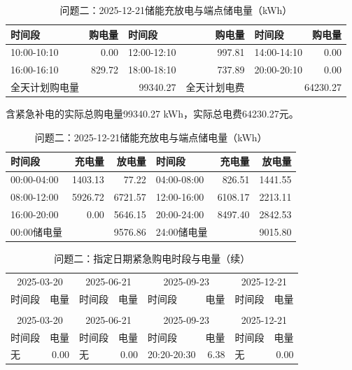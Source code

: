 \begin{table}[H]\centering\small\setlength{\tabcolsep}{5pt}
\caption{问题二：2025-12-21购电结果（电量：kWh；费用：元）}
\begin{tabular}{lrlrlr}\toprule
时间段 & 购电量 & 时间段 & 购电量 & 时间段 & 购电量 \\\midrule
10:00-10:10 & 0.00 & 12:00-12:10 & 997.81 & 14:00-14:10 & 0.00\\
16:00-16:10 & 829.72 & 18:00-18:10 & 737.89 & 20:00-20:10 & 0.00\\
\midrule 全天计划购电量 & \multicolumn{2}{r}{99340.27} & 全天计划电费 & \multicolumn{2}{r}{64230.27}\\\bottomrule
\end{tabular}
\par\vspace{2pt}\footnotesize
含紧急补电的实际总购电量99340.27 kWh，实际总电费64230.27元。
\vspace{3pt}\small
\caption{问题二：2025-12-21储能充放电与端点储电量（kWh）}
\begin{tabular}{lrrlrr}\toprule
时间段 & 充电量 & 放电量 & 时间段 & 充电量 & 放电量 \\\midrule
00:00-04:00 & 1403.13 & 77.22 & 04:00-08:00 & 826.51 & 1441.55\\
08:00-12:00 & 5926.72 & 6721.57 & 12:00-16:00 & 6108.17 & 2213.11\\
16:00-20:00 & 0.00 & 5646.15 & 20:00-24:00 & 8497.40 & 2842.53\\
\midrule 00:00储电量 & \multicolumn{2}{r}{9576.86} & 24:00储电量 & \multicolumn{2}{r}{9015.80}\\\bottomrule
\end{tabular}\end{table}
{\footnotesize\setlength{\tabcolsep}{3pt}
\begin{longtable}{lr|lr|lr|lr}
\caption{问题二：指定日期紧急购电时段与电量（kWh）}\\
\toprule
\multicolumn{2}{c}{2025-03-20} & \multicolumn{2}{c}{2025-06-21} & \multicolumn{2}{c}{2025-09-23} & \multicolumn{2}{c}{2025-12-21}\\
时间段 & 电量 & 时间段 & 电量 & 时间段 & 电量 & 时间段 & 电量\\\midrule\endfirsthead
\caption[]{问题二：指定日期紧急购电时段与电量（续）}\\
\toprule
\multicolumn{2}{c}{2025-03-20} & \multicolumn{2}{c}{2025-06-21} & \multicolumn{2}{c}{2025-09-23} & \multicolumn{2}{c}{2025-12-21}\\
时间段 & 电量 & 时间段 & 电量 & 时间段 & 电量 & 时间段 & 电量\\\midrule\endhead
无 & 0.00 & 无 & 0.00 & 20:20-20:30 & 6.38 & 无 & 0.00\\
\bottomrule\end{longtable}}
